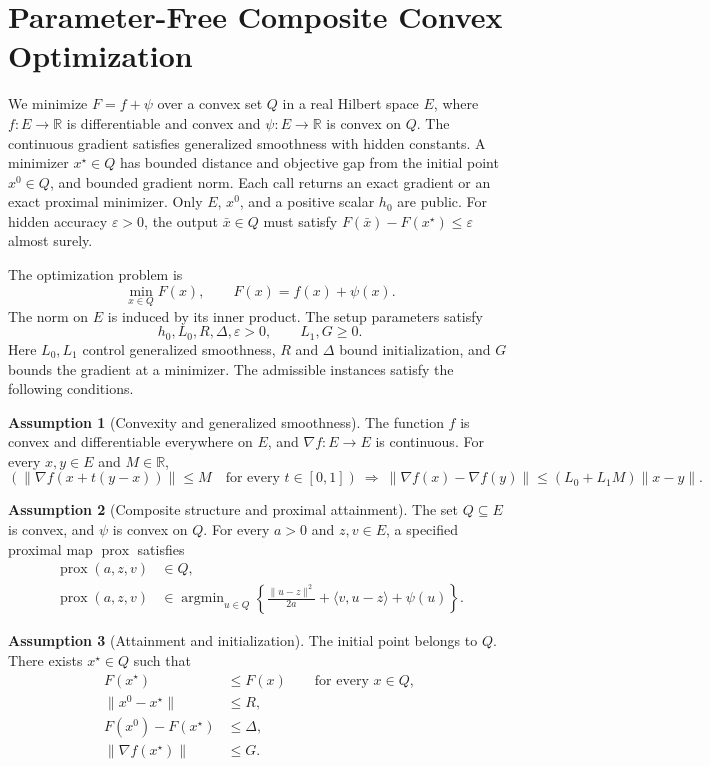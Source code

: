 \documentclass[10pt]{article}
\theoremstyle{definition}
\newtheorem{assumption}{Assumption}
\begin{document}
\section*{Parameter-Free Composite Convex Optimization}
We minimize $F=f+\psi$ over a convex set $Q$ in a real Hilbert space $E$, where $f:E\to\mathbb{R}$ is differentiable and convex and $\psi:E\to\mathbb{R}$ is convex on $Q$. The continuous gradient satisfies generalized smoothness with hidden constants. A minimizer $x^\star\in Q$ has bounded distance and objective gap from the initial point $x^0\in Q$, and bounded gradient norm. Each call returns an exact gradient or an exact proximal minimizer. Only $E$, $x^0$, and a positive scalar $h_0$ are public. For hidden accuracy $\varepsilon>0$, the output $\bar{x}\in Q$ must satisfy $F(\bar{x})-F(x^\star)\leq\varepsilon$ almost surely.

The optimization problem is
\[
\min_{x\in Q} F(x), \qquad F(x)=f(x)+\psi(x).
\]
The norm on $E$ is induced by its inner product. The setup parameters satisfy
\[
h_0,L_0,R,\Delta,\varepsilon>0,
\qquad L_1,G\geq 0.
\]
Here $L_0,L_1$ control generalized smoothness, $R$ and $\Delta$ bound initialization, and $G$ bounds the gradient at a minimizer. The admissible instances satisfy the following conditions.

\begin{assumption}[Convexity and generalized smoothness]
The function $f$ is convex and differentiable everywhere on $E$, and $\nabla f:E\to E$ is continuous. For every $x,y\in E$ and $M\in\mathbb{R}$,
\[
\left(\|\nabla f(x+t(y-x))\|\leq M
\quad\text{for every }t\in[0,1]\right)
\ \Longrightarrow\ 
\|\nabla f(x)-\nabla f(y)\|
\leq (L_0+L_1M)\|x-y\|.
\]
\end{assumption}

\begin{assumption}[Composite structure and proximal attainment]
The set $Q\subseteq E$ is convex, and $\psi$ is convex on $Q$. For every $a>0$ and $z,v\in E$, a specified proximal map $\operatorname{prox}$ satisfies
\begin{align*}
\operatorname{prox}(a,z,v)&\in Q,\\
\operatorname{prox}(a,z,v)&\in
\mathop{\operatorname{argmin}}_{u\in Q}
\left\{
\frac{\|u-z\|^2}{2a}
+\langle v,u-z\rangle+\psi(u)
\right\}.
\end{align*}
\end{assumption}

\begin{assumption}[Attainment and initialization]
The initial point belongs to $Q$. There exists $x^\star\in Q$ such that
\begin{align*}
F(x^\star)&\leq F(x) \qquad\text{for every }x\in Q,\\
\|x^0-x^\star\|&\leq R,\\
F(x^0)-F(x^\star)&\leq\Delta,\\
\|\nabla f(x^\star)\|&\leq G.
\end{align*}
\end{assumption}
\end{document}
